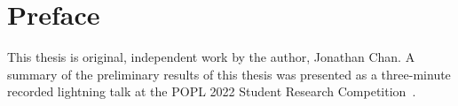 \chapter{Preface}

This thesis is original, independent work by the author, Jonathan Chan.
A summary of the preliminary results of this thesis was presented
as a three-minute recorded lightning talk
at the POPL 2022 Student Research Competition~\citep{src}.
